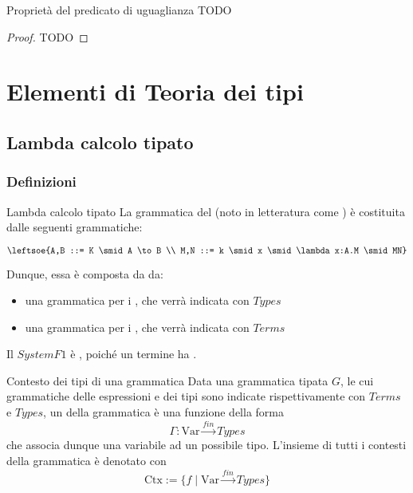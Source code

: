 \documentclass[a4paper, 12pt]{report}
\begin{document}
    \begin{framedprop}{Proprietà del predicato di uguaglianza}
        TODO
    \end{framedprop}

    \begin{proof}
        TODO
    \end{proof}

    \chapter{Elementi di Teoria dei tipi}

    \section{Lambda calcolo tipato}

    \subsection{Definizioni}

    \begin{frameddefn}{Lambda calcolo tipato}
        La grammatica del  (noto in letteratura come ) è costituita dalle seguenti grammatiche:

        $$\leftsoe{A,B ::= K \smid A \to B \\ M,N ::= k \smid x \smid \lambda x:A.M \smid MN}$$

        Dunque, essa è composta da da:

        \begin{itemize}
            \item una grammatica per i , che verrà indicata con $Types$
            \item una grammatica per i , che verrà indicata con $Terms$
        \end{itemize}

        Il $System F1$ è , poiché un termine ha .
    \end{frameddefn}

    \begin{frameddefn}{Contesto dei tipi di una grammatica}
        Data una grammatica tipata $G$, le cui grammatiche delle espressioni e dei tipi sono indicate rispettivamente con $Terms$ e $Types$, un  della grammatica  è una funzione della forma $$\Gamma : \mathrm{Var} \stackrel{fin}{\to} Types$$ che associa dunque una variabile ad un possibile tipo. L'insieme di tutti i contesti della grammatica è denotato con $$\mathrm{Ctx} := \{f \mid \mathrm{Var} \stackrel{fin}{\to} Types\}$$
    \end{frameddefn}
\end{document}
